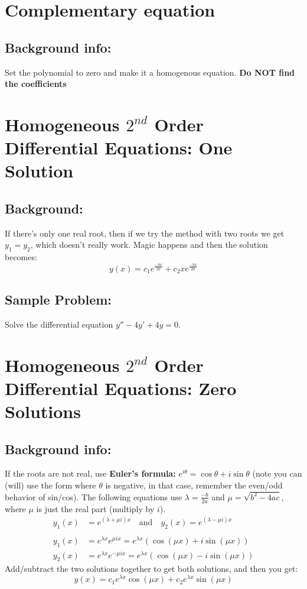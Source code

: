 \documentclass{article}
\begin{document}
\hypertarget{cequation}{
    \section*{Complementary equation}
    \subsection*{Background info:}
   	Set the polynomial to zero and make it a homogenous equation. \textbf{Do NOT find the coefficients} 
}
\hypertarget{oneSolution}{
    \section*{Homogeneous $2^{nd}$ Order Differential Equations: One Solution}
    \subsection*{Background:}
    If there's only one real root, then if we try the method with two roots we get $y_1 = y_2$, which doesn't really work. Magic happens and then the solution becomes: 
  \begin{equation*}
  y(x) = c_1 e^{\frac{-bx}{2a}} + c_2 xe^{\frac{-bx}{2a}}
  \end{equation*}
    \subsection*{Sample Problem:}
    Solve the differential equation $y'' - 4y' + 4y = 0$.
}
\hypertarget{zeroSolutions}{
    \section*{Homogeneous $2^{nd}$ Order Differential Equations: Zero Solutions}
    \subsection*{Background info:}
    If the roots are not real, use \textbf{Euler's formula:} $e^{i\theta} = \cos\theta + i\sin\theta$ (note you can (will) use the form where $\theta$ is negative, in that case, remember the even/odd behavior of sin/cos). The following equations use $\lambda = \frac{-b}{2a}$ and $\mu = \sqrt{b^2 - 4ac}$, where $\mu$ is just the real part (multiply by $i$). 
  \begin{align*}
	y_1(x) &= e^{(\lambda + \mu i)x} \quad \text{and} \quad y_2(x) = e^{(\lambda - \mu i)x} \\
	\\
	y_1(x) &= e^{\lambda x} e^{\mu i x} = e^{\lambda x} (\cos(\mu x) + i \sin(\mu x)) \\
	y_2(x) &= e^{\lambda x} e^{-\mu i x} = e^{\lambda x} (\cos(\mu x) - i \sin(\mu x))
  \end{align*}
  Add/subtract the two solutions together to get both solutions, and then you get:
  \begin{equation*}
  y(x) = c_1 e^{\lambda x} \cos(\mu x) + c_2 e^{\lambda x} \sin(\mu x)
  \end{equation*}
}
\end{document}
